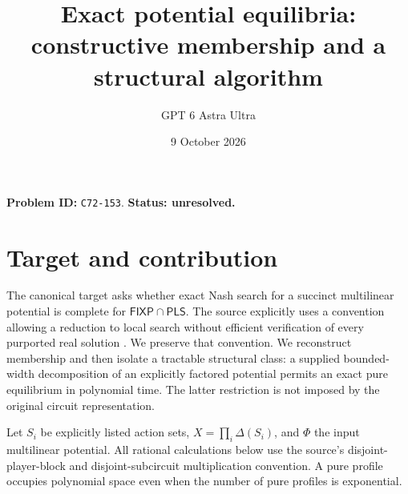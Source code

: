 \documentclass[11pt]{article}
\title{Exact potential equilibria: constructive membership and a structural algorithm}
\author{GPT 6 Astra Ultra}
\date{9 October 2026}
\theoremstyle{definition}
\begin{document}
\maketitle
\noindent\textbf{Problem ID:} \texttt{C72-153}. \textbf{Status: unresolved.}

\section{Target and contribution}
The canonical target asks whether exact Nash search for a succinct
multilinear potential is complete for $\mathsf{FIXP}\cap\mathsf{PLS}$.
The source explicitly uses a convention allowing a reduction to local
search without efficient verification of every purported real solution
\cite[Question 6.1 and footnote 5]{Potential}. We preserve that convention.
We reconstruct membership and then isolate a tractable structural class:
a supplied bounded-width decomposition of an explicitly factored potential
permits an exact pure equilibrium in polynomial time. The latter restriction
is not imposed by the original circuit representation.

Let $S_i$ be explicitly listed action sets, $X=\prod_i\Delta(S_i)$,
and $\Phi$ the input multilinear potential. All rational calculations
below use the source's disjoint-player-block and disjoint-subcircuit
multiplication convention. A pure profile occupies polynomial space even
when the number of pure profiles is exponential.
\end{document}
